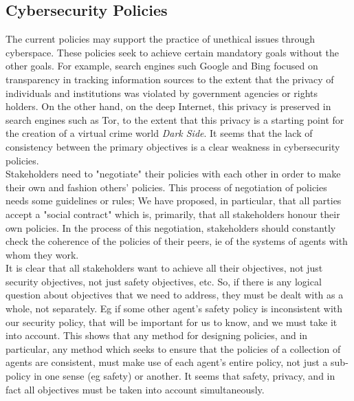 \subsection{Cybersecurity Policies}
The current policies may support the practice 
of unethical issues through cyberspace.
 These policies seek to achieve certain mandatory goals without the other goals.
 For example,  search engines such Google and Bing focused on transparency in tracking information sources to the extent that the privacy of individuals and institutions was violated by government agencies or rights holders. On the other hand, on the deep Internet, this privacy is preserved in search engines such as Tor, to the extent that this privacy is a starting point for the creation of a virtual crime world \emph{Dark Side}. It seems that the lack of consistency between the primary objectives is a clear weakness in cybersecurity policies.
\\ Stakeholders need to "negotiate" their policies with each other in order to make their own and fashion others' policies. This process of negotiation of policies needs some guidelines or rules; We have proposed, in particular, that all parties accept a "social contract" which is, primarily, that all stakeholders honour their own policies. In the process of this negotiation, stakeholders should constantly check the coherence of the policies of their peers, ie of the systems of agents with whom they work.
\\ It is clear that all stakeholders want to achieve all their objectives, not just security objectives, not just safety objectives, etc. So, if there is any logical question about objectives that we need to address, they must be dealt with as a whole, not separately. Eg if some other agent's safety policy is inconsistent with our security policy, that will be important for us to know, and we must take it into account. This shows that any method for designing policies, and in particular, any method which seeks to ensure that the policies of a collection of agents are consistent, must make use of each agent's entire policy, not just a sub-policy in one sense (eg safety) or another. It seems that safety, privacy, and in fact all objectives must be taken into account simultaneously. 

